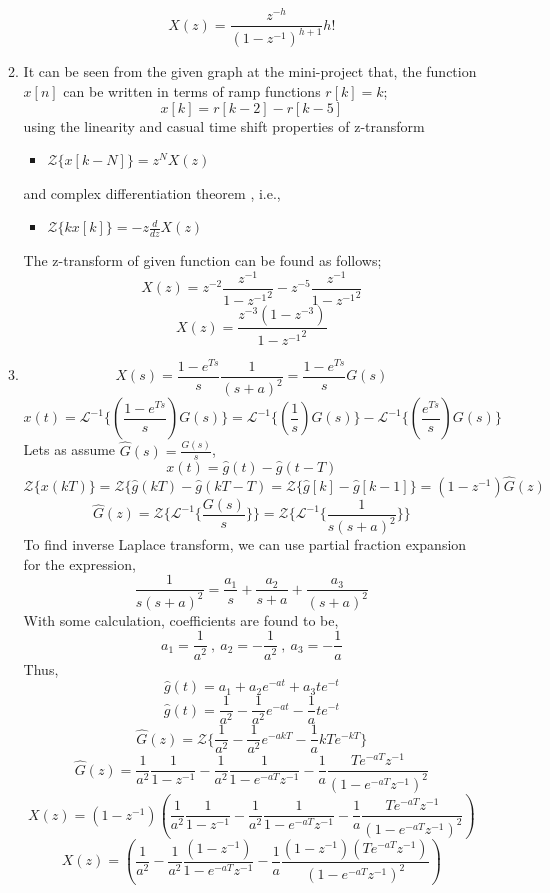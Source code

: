 \documentclass[a4paper,12pt]{article}
\begin{document}
\begin{enumerate}
\begin{enumerate}
			$$\boxed{	X(z)=\frac{z^{-h}}{{(1-z^{-1})}^{h+1}}h! }$$
			\item 	It can be seen from the given graph at the mini-project that, the function $x[n]$ can be written in terms of ramp functions $r[k]=k$; 
			$$\boxed{ x[k]=r[k-2]-r[k-5]	}$$
			using the linearity and casual time shift properties of z-transform 
			\begin{itemize}
				\item $	\mathcal{Z}\{x[k-N]\}=z^{N}X(z) $
			\end{itemize}
			and complex differentiation theorem , i.e.,
			\begin{itemize}
				\item $	\mathcal{Z}\{kx[k]\}=-z\frac{d}{dz} X(z)	$
			\end{itemize}
			The z-transform of given function can be found as follows;
			$$	X(z)=z^{-2}\frac{z^{-1}}{{1-z^{-1}}^2}-z^{-5}\frac{z^{-1}}{{1-z^{-1}}^2}	$$
			$$\boxed{	X(z)=\frac{z^{-3}(1-z^{-3})}{{1-z^{-1}}^2}	}$$
			
			\item
			$$ X(s)=\frac{1-e^{Ts}}{s}\frac{1}{(s+a)^2}=\frac{1-e^{Ts}}{s}G(s)$$
			$$	x(t)=\mathcal{L}^{-1}\{ (\frac{1-e^{Ts}}{s}) G(s) \}=\mathcal{L}^{-1}\{ (\frac{1}{s}) G(s) \}-\mathcal{L}^{-1}\{ (\frac{e^{Ts}}{s}) G(s) \}	$$
			Lets as assume $\hat{G}(s)=\frac{G(s)}{s}$, 
			$$ x(t)=\hat{g}(t)-\hat{g}(t-T) $$
			$$ \mathcal{Z}\{ x(kT) \}=\mathcal{Z}\{ \hat{g}(kT)-\hat{g}(kT-T)=\mathcal{Z}\{ \hat{g}[k]-\hat{g}[k-1]\}=(1-z^{-1})\hat{G}(z) $$
			$$ 	\hat{G}(z)= \mathcal{Z}\{ \mathcal{L}^{-1} \{ \frac{G(s)}{s}\}\}=\mathcal{Z}\{ \mathcal{L}^{-1} \{ \frac{1}{s(s+a)^2} \}\}$$
			To find inverse Laplace transform, we can use partial fraction expansion for the expression, 		
			$$   \frac{1}{s(s+a)^2}  = \frac{a_1}{s}+\frac{a_2}{s+a}+\frac{a_3}{{(s+a)}^2} $$
			With some calculation, coefficients are found to be, \\
			$$ \boxed{a_1=\frac{1}{a^2}} \ ,\ \boxed{a_2=-\frac{1}{a^2}}\ ,\ \boxed{a_3=-\frac{1}{a}} $$			
			Thus,
			$$  \hat{g}(t)  = a_1 +a_2 e^{-at}+ a_3te^{-t} $$
			$$	\hat{g}(t)  = \frac{1}{a^2} -\frac{1}{a^2} e^{-at}-\frac{1}{a}te^{-t} $$	 
			$$ 	\hat{G}(z)= \mathcal{Z}\{ \frac{1}{a^2} -\frac{1}{a^2} e^{-akT}-\frac{1}{a}kTe^{-kT}  \} $$
			$$ 	\hat{G}(z)= \frac{1}{a^2} \frac{1}{1-z^{-1}} - \frac{1}{a^2} \frac{1}{1-e^{-aT}z^{-1}} - \frac{1}{a} \frac{Te^{-aT}z^{-1}}{{(1-e^{-aT}z^{-1})}^2}	$$
			$$	X(z)=(1-z^{-1})(\frac{1}{a^2} \frac{1}{1-z^{-1}} - \frac{1}{a^2} \frac{1}{1-e^{-aT}z^{-1}} - \frac{1}{a} \frac{Te^{-aT}z^{-1}}{{(1-e^{-aT}z^{-1})}^2}	)		$$ 
			$$\boxed{	X(z)=(\frac{1}{a^2} - \frac{1}{a^2} \frac{(1-z^{-1})}{1-e^{-aT}z^{-1}} - \frac{1}{a} \frac{(1-z^{-1})(Te^{-aT}z^{-1})}{{(1-e^{-aT}z^{-1})}^2}	)		}$$ 	
		\end{enumerate}
	

\end{enumerate}
\end{document}
